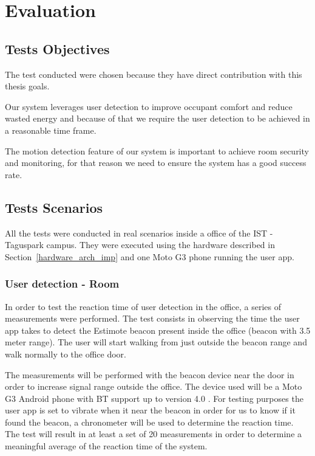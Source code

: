 \chapter{Evaluation}
\label{chapter:evaluation}

\section{Tests Objectives}

The test conducted were chosen because they have direct contribution with this thesis goals.

Our system leverages user detection to improve occupant comfort and reduce wasted energy and because of that we require the user detection to be achieved in a reasonable time frame.

The motion detection feature of our system is important to achieve room security and monitoring, for that reason we need to ensure the system has a good success rate. 


\section{Tests Scenarios}



All the tests were conducted in real scenarios inside a office of the IST - Taguspark campus. They
were executed using the hardware described in Section~\ref{hardware_arch_imp} and one Moto G3 phone running the user app.


\subsection{User detection - Room}


In order to test the reaction time of user detection in the office, a series of measurements were performed. The test consists in observing the time the user app takes to detect the Estimote beacon present inside the office (beacon with 3.5 meter range). The user will start walking from just outside the beacon range and walk normally to the office door.

The measurements will be performed with the beacon device near the door in order to increase signal range outside the office. The device used will be a Moto G3 Android phone with BT support up to version 4.0 .
For testing purposes the user app is set to vibrate when it near the beacon in order for us to know if it found the beacon, a chronometer will be used to determine the reaction time. The test will result in at least a set of 20 measurements in order to determine a meaningful average of the reaction time of the system.


